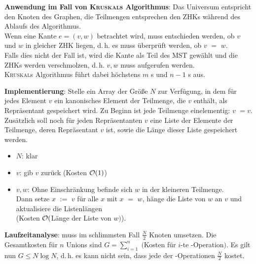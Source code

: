 \textbf{Anwendung im Fall von \textsc{Kruskal}s Algorithmus}:
Das Universum entspricht den Knoten des Graphen,
die Teilmengen entsprechen den ZHKs während des Ablaufs des Algorithmus. \\
Wenn eine Kante $e = (v, w)$ betrachtet wird, muss entschieden werden,
ob $v$ und $w$ in gleicher ZHK liegen, d.\,h. es muss überprüft werden, ob
$v$\code{)} $=$ $w$\code{)}. \\
Falls dies nicht der Fall ist, wird die Kante als Teil des MST gewählt und
die ZHKs werden verschmolzen, d.\,h. $v, w$\code{)} muss
aufgerufen werden. \\
\textsc{Kruskal}s Algorithmus führt dabei höchstens $m$ s und
$n - 1$ s aus.

\linie
\pagebreak

\textbf{Implementierung}:
Stelle ein Array  der Größe $N$ zur Verfügung, in dem für jedes
Element $v$ ein kanonisches Element der Teilmenge, die $v$ enthält,
als Repräsentant gespeichert wird.
Zu Beginn ist jede Teilmenge einelementig: \code{TM[}$v$\code{]} $= v$. \\
Zusätzlich soll noch für jeden Repräsentanten $v$ eine Liste der Elemente der
Teilmenge, deren Repräsentant $v$ ist, sowie die Länge dieser Liste
gespeichert werden.

\begin{itemize}
    \item
    \textbf{$N$\code{)}}:
    klar

    \item
    \textbf{$v$\code{)}}:
    gib \code{TM[}$v$\code{]} zurück
    (Kosten $\mathcal{O}(1)$)

    \item
    \textbf{$v, w$\code{)}}:
    Ohne Einschränkung befinde sich $w$ in der kleineren Teilmenge. \\
    Dann setze \code{TM[}$x$\code{]} $:=$ $v$\code{)} für alle
    $x$ mit \code{TM[}$x$\code{]} $=$ $w$\code{)}, hänge die
    Liste von $w$\code{)} an $v$\code{)} und
    aktualisiere die Listenlängen \\
    (Kosten $\mathcal{O}($Länge der Liste von $w$\code{)}$)$).
\end{itemize}

\linie

\textbf{Laufzeitanalyse}:
 muss im schlimmsten Fall $\frac{N}{2}$ Knoten umsetzen.
Die Gesamtkosten für $n$ Unions sind
$G = \sum_{i=1}^n \;($Kosten für $i$-te -Operation$)$.
Es gilt nun $G \le N \log N$, d.\,h. es kann nicht sein, dass jede der
-Operationen $\frac{N}{2}$ kostet.

